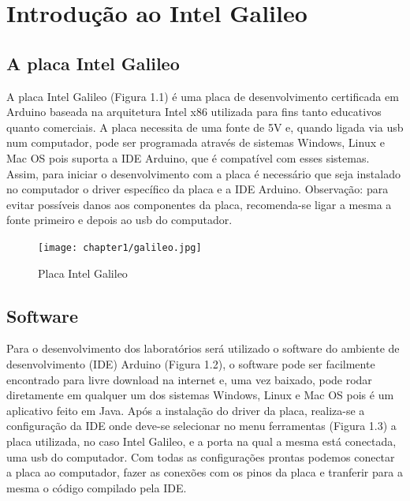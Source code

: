 %
%
%
\chapter{Introdução ao Intel Galileo}
\label{intro} %


\section{A placa Intel Galileo}
\label{sec:1}

A placa Intel Galileo (Figura 1.1) é uma placa de desenvolvimento certificada em Arduino baseada na arquitetura Intel x86 utilizada para fins tanto educativos quanto comerciais. A placa necessita de uma fonte de 5V e, quando ligada via usb num computador, pode ser programada através de sistemas Windows, Linux e Mac OS pois suporta a IDE Arduino, que é compatível com esses sistemas. Assim, para iniciar o desenvolvimento com a placa é necessário que seja instalado no computador o driver específico da placa e a IDE Arduino. 
Observação: para evitar possíveis danos aos componentes da placa, recomenda-se ligar a mesma a fonte primeiro e depois ao usb do computador. 

\begin{figure}[h]
\centering
\texttt{[image: chapter1/galileo.jpg]}
\caption{Placa Intel Galileo}
\label{fig:1}
\end{figure}

\section{Software}
\label{sec:2}

Para o desenvolvimento dos laboratórios será utilizado o software do ambiente de desenvolvimento (IDE) Arduino (Figura 1.2), o software pode ser facilmente encontrado para livre download na internet e, uma vez baixado, pode rodar diretamente em qualquer um dos sistemas Windows, Linux e Mac OS pois é um aplicativo feito em Java. Após a instalação do driver da placa, realiza-se a configuração da IDE onde deve-se selecionar no menu ferramentas (Figura 1.3) a placa utilizada, no caso Intel Galileo, e a porta na qual a mesma está conectada, uma usb do computador. Com todas as configurações prontas podemos conectar a placa ao computador, fazer as conexões com os pinos da placa e tranferir para a mesma o código compilado pela IDE.

